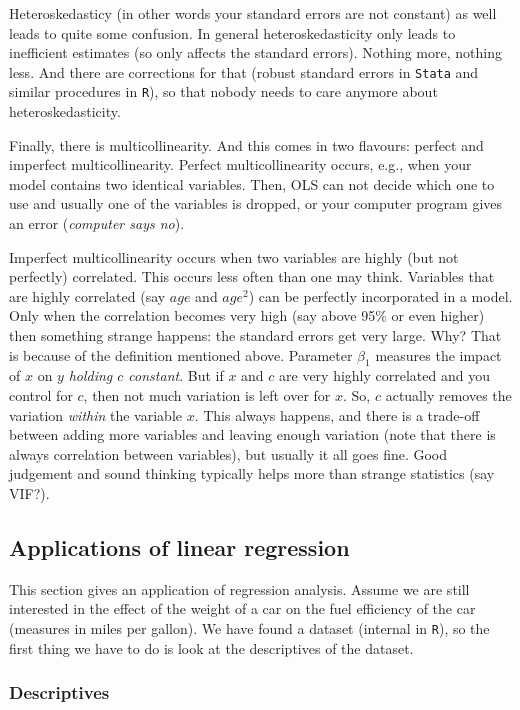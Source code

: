 \documentclass[]{article}
\theoremstyle{definition}
\theoremstyle{definition}
\theoremstyle{definition}
\theoremstyle{remark}
\begin{document}
Heteroskedasticy (in other words your standard errors are not constant)
as well leads to quite some confusion. In general heteroskedasticity
only leads to inefficient estimates (so only affects the standard
errors). Nothing more, nothing less. And there are corrections for that
(robust standard errors in \texttt{Stata} and similar procedures in
\texttt{R}), so that nobody needs to care anymore about
heteroskedasticity.

Finally, there is multicollinearity. And this comes in two flavours:
perfect and imperfect multicollinearity. Perfect multicollinearity
occurs, e.g., when your model contains two identical variables. Then,
OLS can not decide which one to use and usually one of the variables is
dropped, or your computer program gives an error (\emph{computer says
no}).

Imperfect multicollinearity occurs when two variables are highly (but
not perfectly) correlated. This occurs less often than one may think.
Variables that are highly correlated (say \(age\) and \(age^2\)) can be
perfectly incorporated in a model. Only when the correlation becomes
very high (say above 95\% or even higher) then something strange
happens: the standard errors get very large. Why? That is because of the
definition mentioned above. Parameter \(\beta_1\) measures the impact of
\(x\) on \(y\) \emph{holding \(c\) constant}. But if \(x\) and \(c\) are
very highly correlated and you control for \(c\), then not much
variation is left over for \(x\). So, \(c\) actually removes the
variation \emph{within} the variable \(x\). This always happens, and
there is a trade-off between adding more variables and leaving enough
variation (note that there is always correlation between variables), but
usually it all goes fine. Good judgement and sound thinking typically
helps more than strange statistics (say VIF?).

\subsection{Applications of linear regression}\label{sec:applications}

This section gives an application of regression analysis. Assume we are
still interested in the effect of the weight of a car on the fuel
efficiency of the car (measures in miles per gallon). We have found a
dataset (internal in \texttt{R}), so the first thing we have to do is
look at the descriptives of the dataset.

\subsubsection{Descriptives}\label{descriptives}
\end{document}
